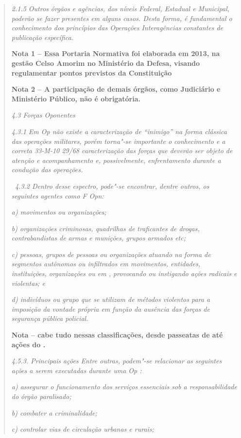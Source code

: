 \begin{quote}
\emph{2.1.5 Outros órgãos e agências, dos níveis Federal, Estadual e
Municipal, poderão se fazer presentes em alguns casos. Desta forma, é
fundamental o conhecimento dos princípios das Operações Interagências
constantes de publicação específica.}

\textbf{Nota 1 -- Essa Portaria Normativa foi elaborada em 2013, na
gestão Celso Amorim no Ministério da Defesa, visando regulamentar pontos
previstos da Constituição~}

\textbf{Nota 2 -- A participação de demais órgãos, como Judiciário e
Ministério Público, não é obrigatória.}

\emph{4.3 Forças Oponentes}

\emph{4.3.1 Em Op  não existe a caracterização de ``inimigo'' na
forma clássica das operações militares, porém torna"-se importante o
conhecimento e a correta 33-M-10 29/\allowbreak{}68 caracterização das forças que
deverão ser objeto de atenção e acompanhamento e, possivelmente,
enfrentamento durante a condução das operações.}

\emph{~4.3.2 Dentro desse espectro, pode"-se encontrar, dentre outros, os
seguintes agentes como F Opn:}

\emph{a) movimentos ou organizações;}

\emph{b) organizações criminosas, quadrilhas de traficantes de drogas,
contrabandistas de armas e munições, grupos armados etc;}

\emph{c) pessoas, grupos de pessoas ou organizações atuando na forma de
segmentos autônomos ou infiltrados em movimentos, entidades,
instituições, organizações ou em , provocando ou instigando ações
radicais e violentas; e}

\emph{d) indivíduos ou grupo que se utilizam de métodos violentos para a
imposição da vontade própria em função da ausência das forças de
segurança pública policial.}

 \textbf{Nota -- cabe tudo nessas classificações, desde passeatas de
 até ações do .}

\emph{4.5.3. Principais ações Entre outras, podem"-se relacionar as
seguintes ações a serem executadas durante uma Op :}

\emph{a) assegurar o funcionamento dos serviços essenciais sob a
responsabilidade do órgão paralisado;}

\emph{b) combater a criminalidade;}

\emph{c) controlar vias de circulação urbanas e rurais;}


\end{quote}
